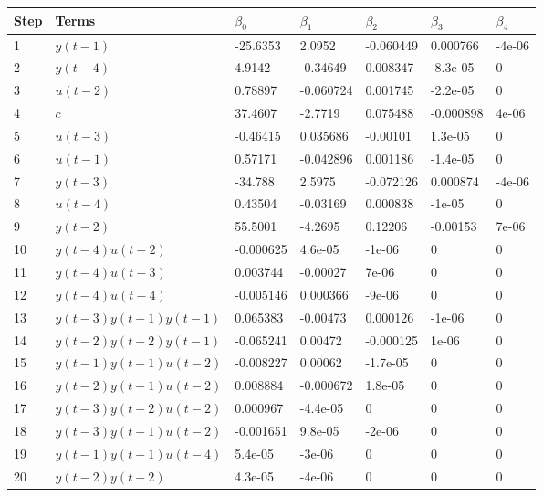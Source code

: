 \begin{tabular}{lllllll}
Step & Terms & $\beta_{0}$ & $\beta_{1}$ & $\beta_{2}$ & $\beta_{3}$ & $\beta_{4}$ \\ 
\hline 
1 & $y(t-1)$ & -25.6353 & 2.0952 & -0.060449 & 0.000766 & -4e-06 \\ 
2 & $y(t-4)$ & 4.9142 & -0.34649 & 0.008347 & -8.3e-05 & 0 \\ 
3 & $u(t-2)$ & 0.78897 & -0.060724 & 0.001745 & -2.2e-05 & 0 \\ 
4 & $c$ & 37.4607 & -2.7719 & 0.075488 & -0.000898 & 4e-06 \\ 
5 & $u(t-3)$ & -0.46415 & 0.035686 & -0.00101 & 1.3e-05 & 0 \\ 
6 & $u(t-1)$ & 0.57171 & -0.042896 & 0.001186 & -1.4e-05 & 0 \\ 
7 & $y(t-3)$ & -34.788 & 2.5975 & -0.072126 & 0.000874 & -4e-06 \\ 
8 & $u(t-4)$ & 0.43504 & -0.03169 & 0.000838 & -1e-05 & 0 \\ 
9 & $y(t-2)$ & 55.5001 & -4.2695 & 0.12206 & -0.00153 & 7e-06 \\ 
10 & $y(t-4)u(t-2)$ & -0.000625 & 4.6e-05 & -1e-06 & 0 & 0 \\ 
11 & $y(t-4)u(t-3)$ & 0.003744 & -0.00027 & 7e-06 & 0 & 0 \\ 
12 & $y(t-4)u(t-4)$ & -0.005146 & 0.000366 & -9e-06 & 0 & 0 \\ 
13 & $y(t-3)y(t-1)y(t-1)$ & 0.065383 & -0.00473 & 0.000126 & -1e-06 & 0 \\ 
14 & $y(t-2)y(t-2)y(t-1)$ & -0.065241 & 0.00472 & -0.000125 & 1e-06 & 0 \\ 
15 & $y(t-1)y(t-1)u(t-2)$ & -0.008227 & 0.00062 & -1.7e-05 & 0 & 0 \\ 
16 & $y(t-2)y(t-1)u(t-2)$ & 0.008884 & -0.000672 & 1.8e-05 & 0 & 0 \\ 
17 & $y(t-3)y(t-2)u(t-2)$ & 0.000967 & -4.4e-05 & 0 & 0 & 0 \\ 
18 & $y(t-3)y(t-1)u(t-2)$ & -0.001651 & 9.8e-05 & -2e-06 & 0 & 0 \\ 
19 & $y(t-1)y(t-1)u(t-4)$ & 5.4e-05 & -3e-06 & 0 & 0 & 0 \\ 
20 & $y(t-2)y(t-2)$ & 4.3e-05 & -4e-06 & 0 & 0 & 0 \\ 
\hline 
\end{tabular}